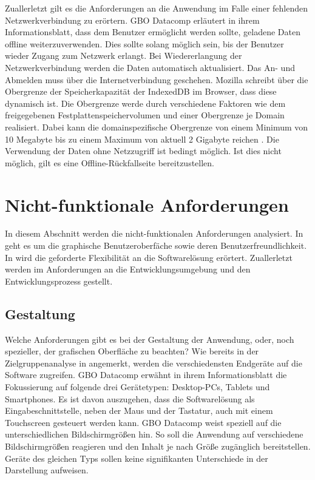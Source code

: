 Zuallerletzt gilt es die Anforderungen an die Anwendung im Falle einer fehlenden Netzwerkverbindung
zu erörtern. GBO Datacomp erläutert in ihrem Informationsblatt, dass dem Benutzer
ermöglicht werden sollte, geladene Daten offline weiterzuverwenden. Dies sollte solang möglich sein,
bis der Benutzer wieder Zugang zum Netzwerk erlangt. Bei Wiedererlangung der Netzwerkverbindung werden
die Daten automatisch aktualisiert. Das An- und Abmelden muss über die Internetverbindung
geschehen. Mozilla schreibt über die Obergrenze der Speicherkapazität der IndexedDB im Browser,
dass diese dynamisch ist. Die Obergrenze werde durch verschiedene Faktoren wie dem freigegebenen
Festplattenspeichervolumen und einer Obergrenze je Domain realisiert. Dabei kann die domainspezifische
Obergrenze von einem Minimum von 10 Megabyte bis zu einem Maximum von aktuell 2 Gigabyte reichen \cite{MozillaStorageLimit}.
Die Verwendung der Daten ohne Netzzugriff ist bedingt möglich. Ist dies nicht möglich, gilt es
eine Offline-Rückfallseite bereitzustellen.

\section{Nicht-funktionale Anforderungen}
\label{sec:nichtfunktionaleanforderungen}
In diesem Abschnitt werden die nicht-funktionalen Anforderungen analysiert.
In  geht es um die graphische Benutzeroberfäche sowie
deren Benutzerfreundlichkeit. In  wird die geforderte
Flexibilität an die Softwarelösung erörtert. Zuallerletzt werden im 
Anforderungen an die Entwicklungsumgebung und den Entwicklungsprozess gestellt.

\subsection{Gestaltung}
\label{subsec:gestaltung}
Welche Anforderungen gibt es bei der Gestaltung der Anwendung, oder, noch spezieller, 
der grafischen Oberfläche zu beachten? Wie bereits in der Zielgruppenanalyse in 
angemerkt, werden die verschiedensten Endgeräte auf die Software zugreifen.
GBO Datacomp erwähnt in ihrem Informationsblatt die Fokussierung auf folgende
drei Gerätetypen: Desktop-PCs, Tablets und Smartphones. Es ist davon auszugehen, dass die
Softwarelösung als Eingabeschnittstelle, neben der Maus und der Tastatur, auch mit einem Touchscreen
gesteuert werden kann. GBO Datacomp weist speziell auf die unterschiedlichen Bildschirmgrößen
hin. So soll die Anwendung auf verschiedene Bildschirmgrößen reagieren und den Inhalt je nach
Größe zugänglich bereitstellen. Geräte des gleichen Typs sollen keine signifikanten Unterschiede
in der Darstellung aufweisen.

